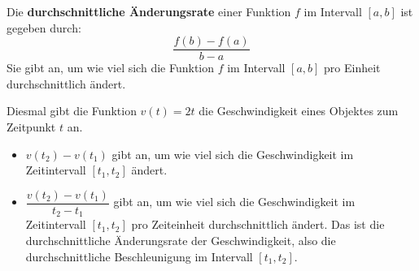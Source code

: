 \begin{deff}{}
    Die \textbf{durchschnittliche Änderungsrate} einer Funktion $f$ im Intervall $[a,b]$ ist gegeben durch:
    \[
        \frac{f(b)-f(a)}{b-a}
    \]
    Sie gibt an, um wie viel sich die Funktion $f$ im Intervall $[a,b]$ pro Einheit durchschnittlich ändert.
\end{deff}
\begin{example}
    Diesmal gibt die Funktion $v(t)=2t$ die Geschwindigkeit eines Objektes zum Zeitpunkt $t$ an.
    \begin{itemize}
        \item $v(t_2)-v(t_1)$ gibt an, um wie viel sich die Geschwindigkeit im Zeitintervall $[t_1,t_2]$ ändert.

        \item $\dfrac{v(t_2)-v(t_1)}{t_2-t_1}$ gibt an, um wie viel sich die Geschwindigkeit im Zeitintervall $[t_1,t_2]$ pro Zeiteinheit durchschnittlich ändert. Das ist die durchschnittliche Änderungsrate der Geschwindigkeit, also die durchschnittliche Beschleunigung im Intervall $[t_1,t_2]$.
    \end{itemize}
\end{example}
